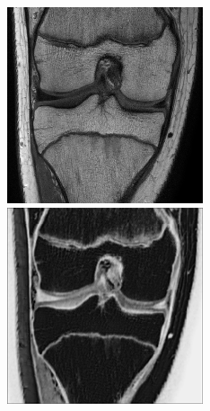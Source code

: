 \begin{figure}[H]
  \includegraphics[width=\linewidth]{imgs/a_input.png}
\endminipage\hfill
{}
  \includegraphics[width=\linewidth]{imgs/down1.png}

\end{figure}
